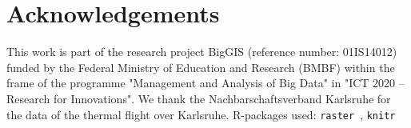 \documentclass{itatnew}
\begin{document}
\section{Acknowledgements}
This work is part of the research project BigGIS (reference number: 01IS14012)
funded by the Federal Ministry of Education and Research (BMBF) within the
frame of the programme "Management and Analysis of Big Data" in "ICT 2020 --
Research for Innovations".
We thank the Nachbarschaftsverband Karlsruhe for the data of the thermal flight
over Karlsruhe. %
\noindent R-packages used: \verb|raster|~\cite{cran:raster}, 
\verb|knitr|~\cite{cran:knitr}


\end{document}
